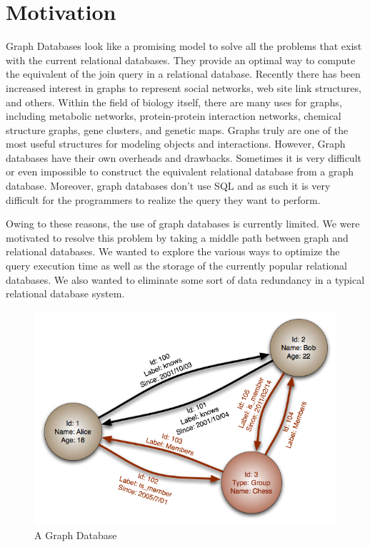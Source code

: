 \documentclass[12pt, oneside]{book}
\begin{document}
\section{Motivation}
Graph Databases look like a promising model to solve all the problems that exist with the current relational databases. They provide an optimal way to compute the equivalent of the join query in a relational database. Recently there has been increased interest in graphs to represent social networks, web site link structures, and others. Within the field of biology itself, there are many uses for graphs, including metabolic networks, protein-protein interaction networks, chemical structure graphs, gene clusters, and genetic maps. Graphs truly are one of the most useful structures for modeling objects and interactions. However, Graph databases have their own overheads and drawbacks. Sometimes it is very difficult or even impossible to construct the equivalent relational database from a graph database. Moreover, graph databases don't use SQL and as such it is very difficult for the programmers to realize the query they want to perform. \\
\par
Owing to these reasons, the use of graph databases is currently limited. We were motivated to resolve this problem by taking a middle path between graph and relational databases. We wanted to explore the various ways to optimize the query execution time as well as the storage of the currently popular relational databases. We also wanted to eliminate some sort of data redundancy in a typical relational database system.
\begin{figure}[h]
 \begin{center}
  \includegraphics[width=\textwidth]{pics/graph.png}
  \caption{A Graph Database}
 \end{center}
\end{figure}
\end{document}
